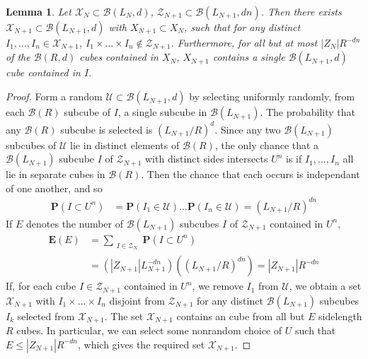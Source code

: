 \documentclass{article}
\theoremstyle{plain}
\newtheorem{lemma}{Lemma}
\theoremstyle{plain}
\begin{document}
\begin{multicols}{2}
\begin{lemma}
	Let $\mathcal{X}_N \subset \mathcal{B}(L_N,d)$, $\mathcal{Z}_{N+1} \subset \mathcal{B}(L_{N+1},dn)$. Then there exists $\mathcal{X}_{N+1} \subset \mathcal{B}(L_{N+1},d)$ with $X_{N+1} \subset X_N$, such that for any distinct $I_1, \dots, I_n \in \mathcal{X}_{N+1}$, $I_1 \times \dots \times I_n \not \in \mathcal{Z}_{N+1}$. Furthermore, for all but at most $|Z_N|R^{-dn}$ of the $\mathcal{B}(R,d)$ cubes contained in $X_N$, $X_{N+1}$ contains a single $\mathcal{B}(L_{N+1},d)$ cube contained in $I$.
\end{lemma}
\begin{proof}
	Form a random $\mathcal{U} \subset \mathcal{B}(L_{N+1},d)$ by selecting uniformly randomly, from each $\mathcal{B}(R)$ subcube of $I$, a single subcube in $\mathcal{B}(L_{N+1})$. The probability that any $\mathcal{B}(R)$ subcube is selected is $(L_{N+1}/R)^d$. Since any two $\mathcal{B}(L_{N+1})$ subcubes of $\mathcal{U}$ lie in distinct elements of $\mathcal{B}(R)$, the only chance that a $\mathcal{B}(L_{N+1})$ subcube $I$ of $\mathcal{Z}_{N+1}$ with distinct sides intersects $U^n$ is if $I_1, \dots, I_n$ all lie in separate cubes in $\mathcal{B}(R)$. Then the chance that each occurs is independant of one another, and so
	\begin{align*}
		\mathbf{P}(I \subset U^n) &= \mathbf{P}(I_1 \in \mathcal{U}) \dots \mathbf{P}(I_n \in \mathcal{U}) = (L_{N+1}/R)^{dn}
	\end{align*}
	If $E$ denotes the number of $\mathcal{B}(L_{N+1})$ subcubes $I$ of $\mathcal{Z}_{N+1}$ contained in $U^n$,
	\begin{align*}
		\mathbf{E}(E) &= \sum_{\substack{I \in \mathcal{Z}_N}} \mathbf{P}(I \subset U^n)\\
		&= (|Z_{N+1}| L_{N+1}^{-dn}) ((L_{N+1}/R)^{dn}) = |Z_{N+1}| R^{-dn}
	\end{align*}
	If, for each cube $I \in \mathcal{Z}_{N+1}$ contained in $U^n$, we remove $I_1$ from $\mathcal{U}$, we obtain a set $\mathcal{X}_{N+1}$ with $I_1 \times \dots \times I_n$ disjoint from $\mathcal{Z}_{N+1}$ for any distinct $\mathcal{B}(L_{N+1})$ subcubes $I_k$ selected from $\mathcal{X}_{N+1}$. The set $\mathcal{X}_{N+1}$ contains an cube from all but $E$ sidelength $R$ cubes. In particular, we can select some nonrandom choice of $U$ such that $E \leq |Z_{N+1}| R^{-dn}$, which gives the required set $\mathcal{X}_{N+1}$.
\end{proof}


\end{multicols}
\end{document}

